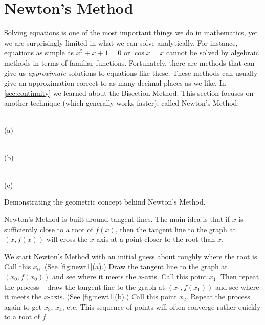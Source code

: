 \section{Newton's Method}\label{sec:newton}

Solving equations is one of the most important things we do in mathematics, yet we are surprisingly limited in what we can solve analytically.  For instance, equations as simple as $x^5+x+1=0$ or $\cos x =x $ cannot be solved by algebraic methods in terms of familiar functions.  Fortunately, there are methods that can give us \textit{approximate} solutions to equations like these.  These methods can usually give an approximation correct to as many decimal places as we like. In \autoref{sec:continuity} we learned about the Bisection Method.  This section focuses on another technique (which generally works faster), called Newton's Method.

{\noindent
\begin{minipage}{.45\textwidth}
 \centering
  \\ (a)
\end{minipage}\quad
\begin{minipage}{.45\textwidth}
 \centering
  \\ (b)
\end{minipage}

\noindent\begin{minipage}{\textwidth}\centering
{} \\ (c)
\captionsetup{type=figure}%
\caption{Demonstrating the geometric concept behind Newton's Method.}\label{fig:newt1}
\end{minipage}
}
{}

Newton's Method is built around tangent lines.  The main idea is that if $x$ is sufficiently close to a root of $f(x)$, then the  tangent line to the graph at $(x,f(x))$ will cross the $x$-axis at a point closer to the root than $x$.  

We start Newton's Method with an initial guess about roughly where the root is.  Call this $x_0$. (See \autoref{fig:newt1}(a).)  Draw the tangent line to the graph at $(x_0,f(x_0))$ and see where it meets the $x$-axis. Call this point $x_1$.  Then repeat the process -- draw the tangent line to the graph at $(x_1, f(x_1))$ and see where it meets the $x$-axis. (See \autoref{fig:newt1}(b).) Call this point $x_2$.  Repeat the process again to get $x_3$, $x_4$, etc.  This sequence of points will often converge rather quickly to a root of $f$.  

